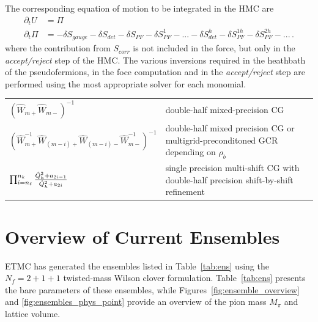 \documentclass[a4paper,11pt]{article}
\begin{document}
The corresponding equation of motion to be integrated in the HMC are
\begin{align*}
  \partial_t U   & =\Pi                \\
  \partial_t \Pi & =-\delta S_{gauge}-
  \delta S_{det} - \delta S_{PF} - \delta S_{PF}^1 -...-
  \delta S^h_{det} -\delta S^{1h}_{PF} - \delta S^{2h}_{PF}-...\,.
\end{align*}
where  the contribution from $S_{corr}$ is not included in the force, but only in the \textit{accept/reject} step of the HMC.
The various inversions required in the heathbath of the pseudofermions, in the foce computation and in the \textit{accept/reject} step are performed using the most appropriate solver for each monomial.
\vspace{1cm}
\begin{tabular}{p{0.3\linewidth}p{0.7\linewidth}}
  \centering $(\hat W_{m+}\hat W_{m-})^{-1}$                                              & double-half mixed-precision CG                                                       \\
  \centering $(\hat W_{m+}^{-1}\hat W_{(m-i)+}\hat W_{(m-i)-}\hat W_{m-}^{-1})^{-1}$      & double-half mixed precision CG or multigrid-preconditoned GCR depending on $\rho_b$  \\
  \centering $\prod_{i=n_\ell}^{n_k} \frac{ \hat{Q}^2_h + a_{2i-1} }{ \hat{Q}^2_h + a_{2i} }$ & single precision multi-shift CG with double-half precision shift-by-shift refinement
\end{tabular}


\section{Overview of Current Ensembles}

ETMC has generated the ensembles listed in Table~\ref{tab:ens} using the \(N_f = 2+1+1\) twisted-mass Wilson clover formulation. Table~\ref{tab:ens} presents the bare parameters of these ensembles, while Figures~\ref{fig:ensemble_overview} and \ref{fig:ensembles_phys_point} provide an overview of the pion mass \(M_\pi\) and lattice volume.
\end{document}
